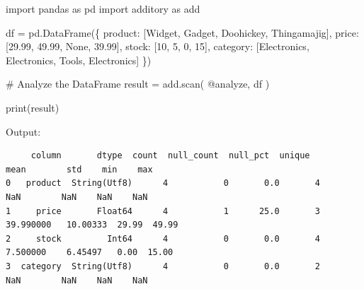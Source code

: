 \documentclass[
  letterpaper,
]{scrbook}
\newenvironment{Shaded}{\begin{snugshade}}{\end{snugshade}}
\newcommand{\BuiltInTok}[1]{\textcolor[rgb]{0.00,0.23,0.31}{#1}}
\newcommand{\CommentTok}[1]{\textcolor[rgb]{0.37,0.37,0.37}{#1}}
\newcommand{\DecValTok}[1]{\textcolor[rgb]{0.68,0.00,0.00}{#1}}
\newcommand{\FloatTok}[1]{\textcolor[rgb]{0.68,0.00,0.00}{#1}}
\newcommand{\ImportTok}[1]{\textcolor[rgb]{0.00,0.46,0.62}{#1}}
\newcommand{\NormalTok}[1]{\textcolor[rgb]{0.00,0.23,0.31}{#1}}
\newcommand{\OperatorTok}[1]{\textcolor[rgb]{0.37,0.37,0.37}{#1}}
\newcommand{\StringTok}[1]{\textcolor[rgb]{0.13,0.47,0.30}{#1}}
\newcommand{\VariableTok}[1]{\textcolor[rgb]{0.07,0.07,0.07}{#1}}
\begin{document}
\begin{Shaded}
\begin{Highlighting}[]
\ImportTok{import}\NormalTok{ pandas }\ImportTok{as}\NormalTok{ pd}
\ImportTok{import}\NormalTok{ additory }\ImportTok{as}\NormalTok{ add}

\NormalTok{df }\OperatorTok{=}\NormalTok{ pd.DataFrame(\{}
    \StringTok{\textquotesingle{}product\textquotesingle{}}\NormalTok{: [}\StringTok{\textquotesingle{}Widget\textquotesingle{}}\NormalTok{, }\StringTok{\textquotesingle{}Gadget\textquotesingle{}}\NormalTok{, }\StringTok{\textquotesingle{}Doohickey\textquotesingle{}}\NormalTok{, }\StringTok{\textquotesingle{}Thingamajig\textquotesingle{}}\NormalTok{],}
    \StringTok{\textquotesingle{}price\textquotesingle{}}\NormalTok{: [}\FloatTok{29.99}\NormalTok{, }\FloatTok{49.99}\NormalTok{, }\VariableTok{None}\NormalTok{, }\FloatTok{39.99}\NormalTok{],}
    \StringTok{\textquotesingle{}stock\textquotesingle{}}\NormalTok{: [}\DecValTok{10}\NormalTok{, }\DecValTok{5}\NormalTok{, }\DecValTok{0}\NormalTok{, }\DecValTok{15}\NormalTok{],}
    \StringTok{\textquotesingle{}category\textquotesingle{}}\NormalTok{: [}\StringTok{\textquotesingle{}Electronics\textquotesingle{}}\NormalTok{, }\StringTok{\textquotesingle{}Electronics\textquotesingle{}}\NormalTok{, }\StringTok{\textquotesingle{}Tools\textquotesingle{}}\NormalTok{, }\StringTok{\textquotesingle{}Electronics\textquotesingle{}}\NormalTok{]}
\NormalTok{\})}

\CommentTok{\# Analyze the DataFrame}
\NormalTok{result }\OperatorTok{=}\NormalTok{ add.scan(}
    \StringTok{\textquotesingle{}@analyze\textquotesingle{}}\NormalTok{,}
\NormalTok{    df}
\NormalTok{)}

\BuiltInTok{print}\NormalTok{(result)}
\end{Highlighting}
\end{Shaded}

Output:

\begin{verbatim}
     column       dtype  count  null_count  null_pct  unique       mean        std    min    max
0   product  String(Utf8)      4           0       0.0       4        NaN        NaN    NaN    NaN
1     price       Float64      4           1      25.0       3  39.990000   10.00333  29.99  49.99
2     stock         Int64      4           0       0.0       4   7.500000    6.45497   0.00  15.00
3  category  String(Utf8)      4           0       0.0       2        NaN        NaN    NaN    NaN
\end{verbatim}
\end{document}
